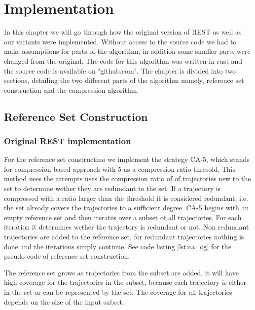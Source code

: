 \chapter{Implementation}
\label{chap:impl}
In this chapter we will go through how the original version of REST as well as our variants were implemented. Without access to the source code we had to make assumptions for parts of the algorithm, in addition some smaller parts were changed from the original. The code for this algorithm was written in rust and the source code is available on "github.com". The chapter is divided into two sections, detailing the two different parts of the algorithm namely, reference set construction and the compression algorithm.

\section{Reference Set Construction}
\subsection{Original REST implementation}
For the reference set constructino we implement the strategy CA-5, which stands for compression based approach with 5 as a compression ratio thresold. This method uses the attempts uses the compression ratio of of trajectories new to the set to determine wether they are redundant to the set. If a trajectory is compressed with a ratio larger than the threshold it is considered redundant, i.e. the set already covers the trajectories to a sufficient degree. CA-5 begins with an empty reference set and then iterates over a subset of all trajectories. For each iteration it determines wether the trajectory is redundant or not. Non redundant trajectories are added to the reference set, for redundant trajectories nothing is done and the iterations simply continue. See code listing \ref{lst:ca_og} for the pseudo code of reference set construction.



The reference set grows as trajectories from the subset are added, it will have high coverage for the trajectories in the subset, because each trajectory is either in the set or can be represented by the set. The coverage for all trajectories depends on the size of the input subset. %

